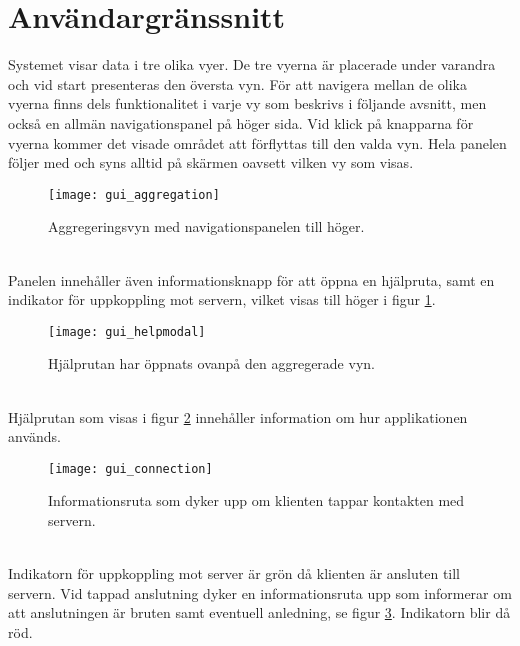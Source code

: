 \section{Användargränssnitt}
\label{sec:results-gui}
Systemet visar data i tre olika vyer. De tre vyerna är placerade under varandra och vid start presenteras den översta vyn. För att navigera mellan de olika vyerna finns dels funktionalitet i varje vy som beskrivs i följande avsnitt, men också en allmän navigationspanel på höger sida. Vid klick på knapparna för vyerna kommer det visade området att förflyttas till den valda vyn. Hela panelen följer med och syns alltid på skärmen oavsett vilken vy som visas.

\begin{figure}[H]
  \centering
  \texttt{[image: gui\_aggregation]}
  \caption{Aggregeringsvyn med navigationspanelen till höger.}
  \label{fig:gui_aggregation}
\end{figure}
\ \\
Panelen innehåller även informationsknapp för att öppna en hjälpruta, samt en indikator för uppkoppling mot servern, vilket visas till höger i figur \ref{fig:gui_aggregation}.  

\begin{figure}[H]
  \centering
  \texttt{[image: gui\_helpmodal]}
  \caption{Hjälprutan har öppnats ovanpå den aggregerade vyn.}
  \label{fig:gui_helpmodal}
\end{figure}
\ \\
Hjälprutan som visas i figur \ref{fig:gui_helpmodal} innehåller information om hur applikationen används.

\begin{figure}[H]
  \centering
  \texttt{[image: gui\_connection]}
  \caption{Informationsruta som dyker upp om klienten tappar kontakten med servern.}
  \label{fig:gui_connection}
\end{figure}
\ \\
Indikatorn för uppkoppling mot server är grön då klienten är ansluten till servern. Vid tappad anslutning dyker en informationsruta upp som informerar om att anslutningen är bruten samt eventuell anledning, se figur \ref{fig:gui_connection}. Indikatorn blir då röd.

